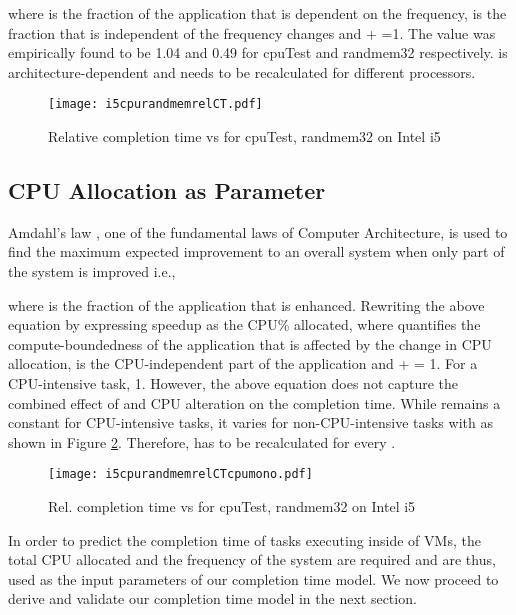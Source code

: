 \documentclass{sig-alternate}
\begin{document}
where  is the fraction of the application that is dependent on the frequency,  is the fraction that is independent of the frequency changes and  +  =1. The  value was empirically found to be 1.04 and 0.49 for cpuTest and randmem32 respectively.  is architecture-dependent \cite{Marinoni2007} and needs to be recalculated for different processors. 

\begin{figure}
\centering
\texttt{[image: i5cpurandmemrelCT.pdf]}
\caption{Relative completion time vs  for cpuTest, randmem32 on Intel i5}
\label{fig:i5cpurandmemrelCT}
\vspace{-0.5cm}
\end{figure}
\subsection{CPU Allocation as Parameter}
\label{sec:cpuCT}

Amdahl's law \cite{Amdahl1967}, one of the fundamental laws of Computer Architecture, is used to find the maximum expected improvement to an overall system when only part of the system is improved i.e., 

where  is the fraction of the application that is enhanced. Rewriting the above equation by expressing speedup  as the CPU\% allocated,  where  quantifies the compute-boundedness of the application that is affected by the change in CPU allocation,  is the CPU-independent part of the application and  +  = 1. For a CPU-intensive task,  1. However, the above equation does not capture the combined effect of  and CPU alteration on the completion time. While  remains a constant for CPU-intensive tasks, it varies for non-CPU-intensive tasks with  as shown in Figure \ref{fig:i5cpurandmemrelCTcpumono}. Therefore,  has to be recalculated for every .

\begin{figure}[!htbp]
\vspace{-0.5cm}
\centering
\texttt{[image: i5cpurandmemrelCTcpumono.pdf]}
\caption{Rel. completion time vs  for cpuTest, randmem32 on Intel i5}
\label{fig:i5cpurandmemrelCTcpumono}
\end{figure}

In order to predict the completion time of tasks executing inside of VMs, the total CPU allocated and the frequency of the system are required and are thus, used as the input parameters of our completion time model. We now proceed to derive and validate our completion time model in the next section. 
\end{document}
